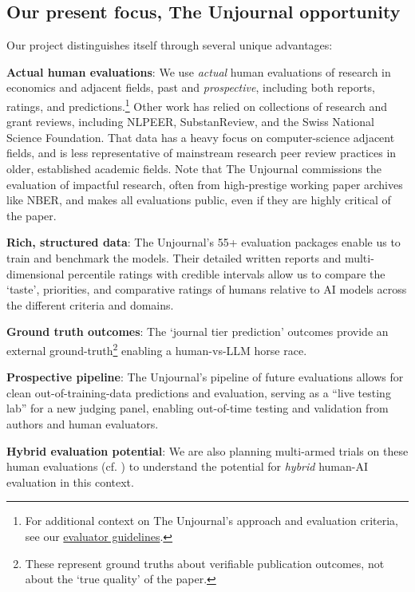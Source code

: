 \documentclass[
  11pt,
  letterpaper,
  DIV=11,
  numbers=noendperiod]{scrreprt}
\begin{document}
\subsection{Our present focus, The Unjournal
opportunity}\label{sec-our-present-focus-the-unjournal-opportunity}

Our project distinguishes itself through several unique advantages:

\textbf{Actual human evaluations}: We use \emph{actual} human
evaluations of research in economics and adjacent fields, past and
\emph{prospective}, including both reports, ratings, and
predictions.\footnote{For additional context on The Unjournal's approach
  and evaluation criteria, see our
  \href{https://unjournal.org}{evaluator guidelines}.} Other work has
relied on collections of research and grant reviews, including NLPEER,
SubstanReview, and the Swiss National Science Foundation. That data has
a heavy focus on computer-science adjacent fields, and is less
representative of mainstream research peer review practices in older,
established academic fields. Note that The Unjournal commissions the
evaluation of impactful research, often from high-prestige working paper
archives like NBER, and makes all evaluations public, even if they are
highly critical of the paper.

\textbf{Rich, structured data}: The Unjournal's 55+ evaluation packages
enable us to train and benchmark the models. Their detailed written
reports and multi-dimensional percentile ratings with credible intervals
allow us to compare the `taste', priorities, and comparative ratings of
humans relative to AI models across the different criteria and domains.

\textbf{Ground truth outcomes}: The `journal tier prediction' outcomes
provide an external ground-truth\footnote{These represent ground truths
  about verifiable publication outcomes, not about the `true quality' of
  the paper.} enabling a human-vs-LLM horse race.

\textbf{Prospective pipeline}: The Unjournal's pipeline of future
evaluations allows for clean out-of-training-data predictions and
evaluation, serving as a ``live testing lab'' for a new judging panel,
enabling out-of-time testing and validation from authors and human
evaluators.

\textbf{Hybrid evaluation potential}: We are also planning multi-armed
trials on these human evaluations (cf.
) to understand the
potential for \emph{hybrid} human-AI evaluation in this context.
\end{document}
